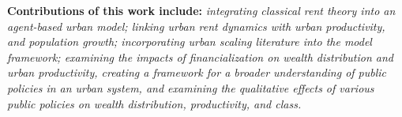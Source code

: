 \documentclass[a4paper]{article}
\theoremstyle{definition}
\theoremstyle{plain}
\begin{document}
\textbf{Contributions of this work include:} \textit{integrating classical rent theory into an agent-based urban model; linking urban rent dynamics with urban productivity, and population growth; incorporating urban scaling literature into the model framework; examining the impacts of financialization on wealth distribution and urban productivity, creating a framework for a broader understanding of public policies in an urban system, and examining the qualitative effects of various public policies on wealth distribution, productivity, and class.}



\end{document}

